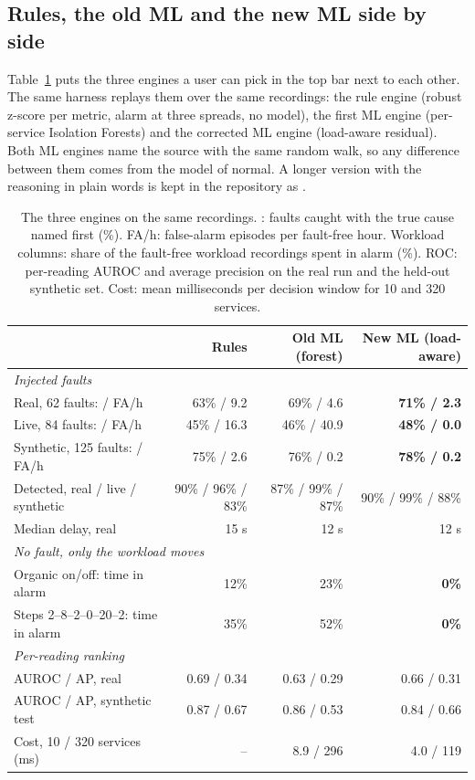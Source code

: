 \subsection{Rules, the old ML and the new ML side by side}
\label{sec:threeway}
Table~\ref{tab:threeway} puts the three engines a user can pick in the top bar next to each other. The same harness replays them over the same recordings: the rule engine (robust z-score per metric, alarm at three spreads, no model), the first ML engine (per-service Isolation Forests) and the corrected ML engine (load-aware residual). Both ML engines name the source with the same random walk, so any difference between them comes from the model of normal. A longer version with the reasoning in plain words is kept in the repository as .

\begin{table}[!htbp]
\centering
\caption[Rules, old ML and new ML on the same recordings]{The three engines on the same recordings. \cn: faults caught with the true cause named first (\%). FA/h: false-alarm episodes per fault-free hour. Workload columns: share of the fault-free workload recordings spent in alarm (\%). ROC: per-reading AUROC and average precision on the real run and the held-out synthetic set. Cost: mean milliseconds per decision window for 10 and 320 services.}
\label{tab:threeway}
\footnotesize
\setlength{\tabcolsep}{4pt}
\begin{tabular}{lrrr}
\toprule
 & Rules & Old ML (forest) & New ML (load-aware)\\
\midrule
\multicolumn{4}{l}{\emph{Injected faults}}\\
Real, 62 faults: \cn{} / FA/h & 63\% / 9.2 & 69\% / 4.6 & \textbf{71\% / 2.3}\\
Live, 84 faults: \cn{} / FA/h & 45\% / 16.3 & 46\% / 40.9 & \textbf{48\% / 0.0}\\
Synthetic, 125 faults: \cn{} / FA/h & 75\% / 2.6 & 76\% / 0.2 & \textbf{78\% / 0.2}\\
Detected, real / live / synthetic & 90\% / 96\% / 83\% & 87\% / 99\% / 87\% & 90\% / 99\% / 88\%\\
Median delay, real & 15 s & 12 s & 12 s\\
\midrule
\multicolumn{4}{l}{\emph{No fault, only the workload moves}}\\
Organic on/off: time in alarm & 12\% & 23\% & \textbf{0\%}\\
Steps 2--8--2--0--20--2: time in alarm & 35\% & 52\% & \textbf{0\%}\\
\midrule
\multicolumn{4}{l}{\emph{Per-reading ranking}}\\
AUROC / AP, real & 0.69 / 0.34 & 0.63 / 0.29 & 0.66 / 0.31\\
AUROC / AP, synthetic test & 0.87 / 0.67 & 0.86 / 0.53 & 0.84 / 0.66\\
\midrule
Cost, 10 / 320 services (ms) & -- & 8.9 / 296 & 4.0 / 119\\
\bottomrule
\end{tabular}
\end{table}

